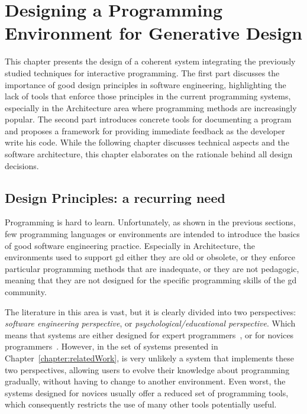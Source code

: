\chapter{Designing a Programming Environment for Generative Design}
\label{chapter:pegd}

This chapter presents the design of a coherent system integrating the previously studied techniques for interactive programming. The first part discusses the importance of good design principles in software engineering, highlighting the lack of tools that enforce those principles in the current programming systems, especially in the Architecture area where programming methods are increasingly popular. The second part introduces concrete tools for documenting a program and proposes a framework for providing immediate feedback as the developer write his code. While the following chapter discusses technical aspects and the software architecture, this chapter elaborates on the rationale behind all design decisions.

\section{Design Principles: a recurring need} 

Programming is hard to learn. Unfortunately, as shown in the previous sections, few programming languages or environments are intended to introduce the basics of good software engineering practice. Especially in Architecture, the environments used to support \gls{gd} either they are old or obsolete, or they enforce particular programming methods that are inadequate, or they are not pedagogic, meaning that they are not designed for the specific programming skills of the \gls{gd} community.

The literature in this area is vast, but it is clearly divided into two perspectives: \textit{software engineering perspective}, or \textit{psychological/educational perspective}. Which means that systems are either designed for expert programmers~\citep{carlson2005eclipse,intellij2001intellij,lighttable,boudreau2002netbeans,guckenheimer2006software}, or for novices programmers~\citep{papert1980mindstorms,goldberg1983smalltalk,GuoSIGCSE2013,Reas2006}. However, in the set of systems presented in Chapter~\ref{chapter:relatedWork}, is very unlikely a system that implements these two perspectives, allowing users to evolve their knowledge about programming gradually, without having to change to another environment. Even worst, the systems designed for novices usually offer a reduced set of programming tools, which consequently restricts the use of many other tools potentially useful. 

